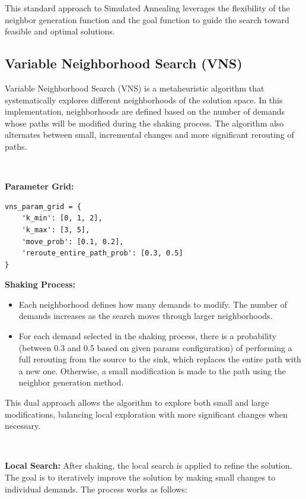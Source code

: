 \documentclass[a4paper,12pt]{article}
\begin{document}
\noindent This standard approach to Simulated Annealing leverages the flexibility of the neighbor generation function and the goal function to guide the search toward feasible and optimal solutions.

\subsection{Variable Neighborhood Search (VNS)}

Variable Neighborhood Search (VNS) is a metaheuristic algorithm that systematically explores different neighborhoods of the solution space. In this implementation, neighborhoods are defined based on the number of demands whose paths will be modified during the shaking process. The algorithm also alternates between small, incremental changes and more significant rerouting of paths.

\

\noindent \textbf{Parameter Grid:}

\begin{verbatim}
vns_param_grid = {
    'k_min': [0, 1, 2],
    'k_max': [3, 5],
    'move_prob': [0.1, 0.2],
    'reroute_entire_path_prob': [0.3, 0.5]
}
\end{verbatim}

\noindent \textbf{Shaking Process:}
\begin{itemize}
    \item Each neighborhood defines how many demands to modify. The number of demands increases as the search moves through larger neighborhoods.
    \item For each demand selected in the shaking process, there is a probability (between 0.3 and 0.5 based on given params configuration) of performing a full rerouting from the source to the sink, which replaces the entire path with a new one. Otherwise, a small modification is made to the path using the neighbor generation method.
\end{itemize}

\noindent This dual approach allows the algorithm to explore both small and large modifications, balancing local exploration with more significant changes when necessary.

\

\noindent \textbf{Local Search:}
After shaking, the local search is applied to refine the solution. The goal is to iteratively improve the solution by making small changes to individual demands. The process works as follows:
\end{document}
